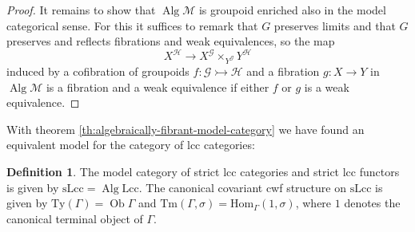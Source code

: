 \documentclass[a4paper]{article}
\theoremstyle{remark}
\theoremstyle{definition}
\newtheorem{definition}[theorem]{Definition}
\begin{document}
\begin{proof}
  It remains to show that $\operatorname{Alg} \mathcal{M}$ is groupoid enriched also in the model categorical sense.
  For this it suffices to remark that $G$ preserves limits and that $G$ preserves and reflects fibrations and weak equivalences, so the map
  \begin{equation}
    X^\mathcal{H} \rightarrow X^\mathcal{G} \times_{Y^\mathcal{G}} Y^\mathcal{H}
  \end{equation}
  induced by a cofibration of groupoids $f : \mathcal{G} \rightarrowtail \mathcal{H}$ and a fibration $g : X \rightarrow Y$ in $\operatorname{Alg} \mathcal{M}$ is a fibration and a weak equivalence if either $f$ or $g$ is a weak equivalence.
\end{proof}

With theorem \ref{th:algebraically-fibrant-model-category} we have found an equivalent model for the category of lcc categories:
\begin{definition}
  The model category of strict lcc categories and strict lcc functors is given by $\mathrm{sLcc} = \operatorname{Alg} \mathrm{Lcc}$.
  The canonical covariant cwf structure on $\mathrm{sLcc}$ is given by $\mathrm{Ty}(\Gamma) = \operatorname{Ob} \Gamma$ and $\mathrm{Tm}(\Gamma, \sigma) = \mathrm{Hom}_\Gamma(1, \sigma)$, where $1$ denotes the canonical terminal object of $\Gamma$.
\end{definition}
\end{document}
